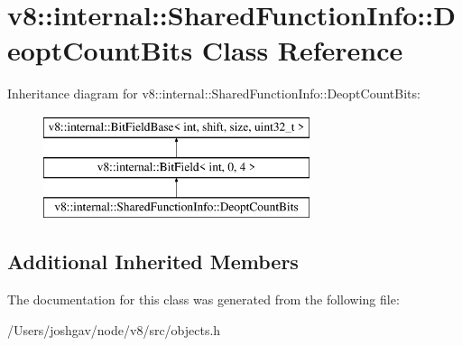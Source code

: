 \hypertarget{classv8_1_1internal_1_1_shared_function_info_1_1_deopt_count_bits}{}\section{v8\+:\+:internal\+:\+:Shared\+Function\+Info\+:\+:Deopt\+Count\+Bits Class Reference}
\label{classv8_1_1internal_1_1_shared_function_info_1_1_deopt_count_bits}
Inheritance diagram for v8\+:\+:internal\+:\+:Shared\+Function\+Info\+:\+:Deopt\+Count\+Bits\+:\begin{figure}[H]
\begin{center}
\leavevmode
\includegraphics[height=3.000000cm]{classv8_1_1internal_1_1_shared_function_info_1_1_deopt_count_bits}
\end{center}
\end{figure}
\subsection*{Additional Inherited Members}


The documentation for this class was generated from the following file\+:\begin{DoxyCompactItemize}
\item 
/\+Users/joshgav/node/v8/src/objects.\+h\end{DoxyCompactItemize}
